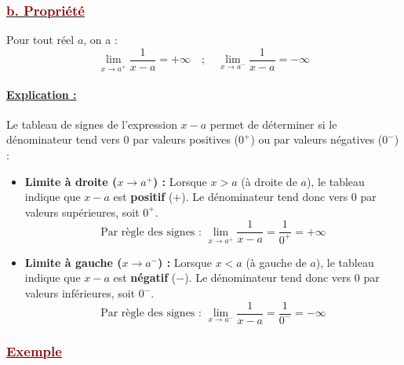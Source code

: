 \documentclass[12pt,a4paper]{article}
\begin{document}
\subsubsection*{\underline{\textcolor{darkred}{ b. Propriété }}}

Pour tout réel $a$, on a :
\[
\lim_{x \to a^+} \frac{1}{x - a} = +\infty \quad ; \quad \lim_{x \to a^-} \frac{1}{x - a} = -\infty
\]

\begin{center}
\end{center}

\paragraph{\underline{Explication :}}
Le tableau de signes de l'expression $x - a$ permet de déterminer si le dénominateur tend vers $0$ par valeurs positives ($0^+$) ou par valeurs négatives ($0^-$) :

\begin{itemize}
    \item \textbf{Limite à droite ($x \to a^+$) :} 
    Lorsque $x > a$ (à droite de $a$), le tableau indique que $x - a$ est \textbf{positif} ($+$). Le dénominateur tend donc vers $0$ par valeurs supérieures, soit $0^+$.
    \[
    \text{Par règle des signes : } \lim_{x \to a^+} \frac{1}{x - a} = \frac{1}{0^+} = +\infty
    \]

    \item \textbf{Limite à gauche ($x \to a^-$) :} 
    Lorsque $x < a$ (à gauche de $a$), le tableau indique que $x - a$ est \textbf{négatif} ($-$). Le dénominateur tend donc vers $0$ par valeurs inférieures, soit $0^-$.
    \[
    \text{Par règle des signes : } \lim_{x \to a^-} \frac{1}{x - a} = \frac{1}{0^-} = -\infty
    \]
\end{itemize}
\subsubsection*{\underline{\textcolor{darkred}{ Exemple }}}    
\end{document}
